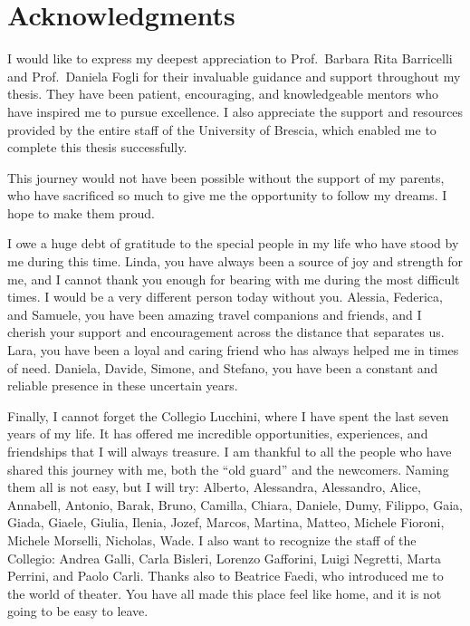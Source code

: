 \chapter*{Acknowledgments}\label{ch:acknowledgments}

I would like to express my deepest appreciation to Prof.\ Barbara Rita Barricelli and Prof.\ Daniela Fogli for their invaluable guidance and support throughout my thesis. They have been patient, encouraging, and knowledgeable mentors who have inspired me to pursue excellence. I also appreciate the support and resources provided by the entire staff of the University of Brescia, which enabled me to complete this thesis successfully.

This journey would not have been possible without the support of my parents, who have sacrificed so much to give me the opportunity to follow my dreams. I hope to make them proud.

I owe a huge debt of gratitude to the special people in my life who have stood by me during this time. Linda, you have always been a source of joy and strength for me, and I cannot thank you enough for bearing with me during the most difficult times. I would be a very different person today without you. Alessia, Federica, and Samuele, you have been amazing travel companions and friends, and I cherish your support and encouragement across the distance that separates us. Lara, you have been a loyal and caring friend who has always helped me in times of need. Daniela, Davide, Simone, and Stefano, you have been a constant and reliable presence in these uncertain years.

Finally, I cannot forget the Collegio Lucchini, where I have spent the last seven years of my life. It has offered me incredible opportunities, experiences, and friendships that I will always treasure. I am thankful to all the people who have shared this journey with me, both the “old guard” and the newcomers. Naming them all is not easy, but I will try: Alberto, Alessandra, Alessandro, Alice, Annabell, Antonio, Barak, Bruno, Camilla, Chiara, Daniele, Dumy, Filippo, Gaia, Giada, Giaele, Giulia, Ilenia, Jozef, Marcos, Martina, Matteo, Michele Fioroni, Michele Morselli, Nicholas, Wade. I also want to recognize the staff of the Collegio: Andrea Galli, Carla Bisleri, Lorenzo Gafforini, Luigi Negretti, Marta Perrini, and Paolo Carli. Thanks also to Beatrice Faedi, who introduced me to the world of theater. You have all made this place feel like home, and it is not going to be easy to leave.

